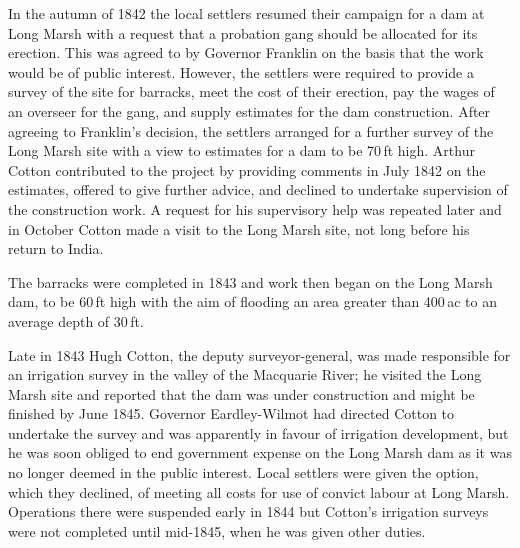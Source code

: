 In the autumn of 1842 the local settlers resumed their campaign for a
dam at Long Marsh with a request that a probation gang should be
allocated for its erection.  This was agreed to by Governor Franklin
on the basis that the work would be of public interest.  However, the
settlers were required to provide a survey of the site for barracks,
meet the cost of their erection, pay the wages of an overseer for the
gang, and supply estimates for the dam construction.  After agreeing
to Franklin's decision, the settlers arranged for a further survey of
the Long Marsh site with a view to estimates for a dam to be 70\,ft
high.  Arthur Cotton contributed to the project by providing comments
in July 1842 on the estimates, offered to give further advice, and
declined to undertake supervision of the construction work.  A request
for his supervisory help was repeated later and in October Cotton made
a visit to the Long Marsh site, not long before his return to
India.

The barracks were completed in 1843 and work then began on the Long
Marsh dam, to be 60\,ft high with the aim of flooding an area greater
than 400\,ac to an average depth of
30\,ft.

Late in 1843 Hugh Cotton, the deputy surveyor-general, was made
responsible for an irrigation survey in the valley of the Macquarie
River; he visited the Long Marsh site and reported that the dam was
under construction and might be finished by June 1845.  Governor
Eardley-Wilmot had directed Cotton to undertake the survey and was
apparently in favour of irrigation development, but he was soon
obliged to end government expense on the Long Marsh dam as it was no
longer deemed in the public interest.  Local settlers were given the
option, which they declined, of meeting all costs for use of convict
labour at Long Marsh.  Operations there were suspended early in 1844
but Cotton's irrigation surveys were not completed until mid-1845,
when he was given other duties.

